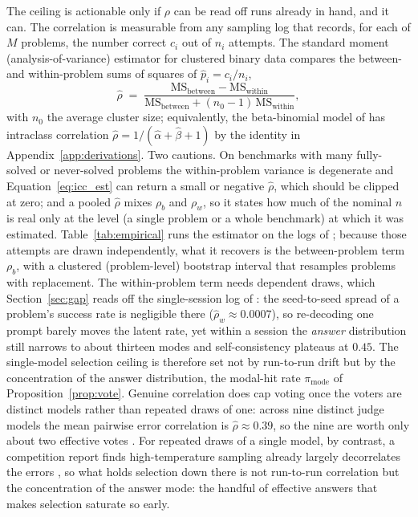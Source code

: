 \documentclass[11pt]{article}
\begin{document}
The ceiling is actionable only if $\rho$ can be read off runs already in hand, and it can. The correlation is measurable from any sampling log that records, for each of $M$ problems, the number correct $c_i$ out of $n_i$ attempts. The standard moment (analysis-of-variance) estimator for clustered binary data \citep{cochran1977sampling} compares the between- and within-problem sums of squares of $\hat p_i = c_i/n_i$,
\begin{equation}
\hat\rho \;=\; \frac{\mathrm{MS}_{\text{between}} - \mathrm{MS}_{\text{within}}}
{\mathrm{MS}_{\text{between}} + (n_0-1)\,\mathrm{MS}_{\text{within}}},
\label{eq:icc_est}
\end{equation}
with $n_0$ the average cluster size; equivalently, the beta-binomial model of \citet{kazdan2025predicting} has intraclass correlation $\hat\rho = 1/(\hat\alpha+\hat\beta+1)$ by the identity in Appendix~\ref{app:derivations}. Two cautions. On benchmarks with many fully-solved or never-solved problems the within-problem variance is degenerate and Equation~\eqref{eq:icc_est} can return a small or negative $\hat\rho$, which should be clipped at zero; and a pooled $\hat\rho$ mixes $\rho_b$ and $\rho_w$, so it states how much of the nominal $n$ is real only at the level (a single problem or a whole benchmark) at which it was estimated. Table~\ref{tab:empirical} runs the estimator on the logs of \citet{brown2024monkeys}; because those attempts are drawn independently, what it recovers is the between-problem term $\rho_b$, with a clustered (problem-level) bootstrap interval that resamples problems with replacement. The within-problem term needs dependent draws, which Section~\ref{sec:gap} reads off the single-session log of \citet{beeching2024scaling}: the seed-to-seed spread of a problem's success rate is negligible there ($\hat\rho_w\approx0.0007$), so re-decoding one prompt barely moves the latent rate, yet within a session the \emph{answer} distribution still narrows to about thirteen modes and self-consistency plateaus at $0.45$. The single-model selection ceiling is therefore set not by run-to-run drift but by the concentration of the answer distribution, the modal-hit rate $\pi_{\mathrm{mode}}$ of Proposition~\ref{prop:vote}. Genuine correlation does cap voting once the voters are distinct models rather than repeated draws of one: across nine distinct judge models the mean pairwise error correlation is $\hat\rho\approx0.39$, so the nine are worth only about two effective votes \citep{kohli2026judges}. For repeated draws of a single model, by contrast, a competition report finds high-temperature sampling already largely decorrelates the errors \citep{nitarach2026aimo}, so what holds selection down there is not run-to-run correlation but the concentration of the answer mode: the handful of effective answers that makes selection saturate so early.
\end{document}
